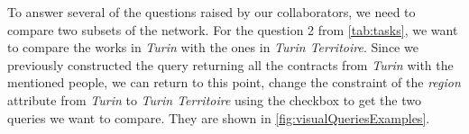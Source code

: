 To answer several of the questions raised by our collaborators, we need to compare two subsets of the network.
For the question 2 from \autoref{tab:tasks}, we want to compare the works in \textit{Turin} with the ones in \textit{Turin Territoire}. Since we previously constructed the query returning all the contracts from \textit{Turin} with the mentioned people, we can
return to this point, change the constraint of the \textit{region} attribute from \textit{Turin} to \textit{Turin Territoire} using the checkbox to get the two queries we want to compare. They are shown in \autoref{fig:visualQueriesExamples}.





